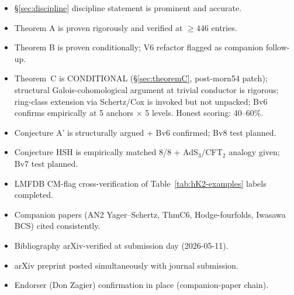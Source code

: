 \documentclass[11pt,a4paper]{amsart}
\theoremstyle{definition}
\begin{document}
\begin{itemize}[leftmargin=2em]
  \item[$\square$] \S\ref{sec:discipline} discipline statement is prominent and accurate.
  \item[$\square$] Theorem A is proven rigorously and verified at $\ge 446$ entries.
  \item[$\square$] Theorem B is proven conditionally; V6 refactor flagged as companion follow-up.
  \item[$\square$] Theorem~C is CONDITIONAL (\S\ref{sec:theoremC}, post-morn54 patch); structural Galois-cohomological argument at trivial conductor is rigorous; ring-class extension via Schertz/Cox is invoked but not unpacked; Bv6 confirms empirically at 5 anchors $\times$ 5 levels. Honest scoring: 40--60\%.
  \item[$\square$] Conjecture A' is structurally argued + Bv6 confirmed; Bv8 test planned.
  \item[$\square$] Conjecture HSH is empirically matched 8/8 + AdS$_3$/CFT$_2$ analogy given; Bv7 test planned.
  \item[$\square$] LMFDB CM-flag cross-verification of Table~\ref{tab:hK2-examples} labels completed.
  \item[$\square$] Companion papers (AN2 Yager--Schertz, ThmC6, Hodge-fourfolds, Iwasawa BCS) cited consistently.
  \item[$\square$] Bibliography arXiv-verified at submission day (2026-05-11).
  \item[$\square$] arXiv preprint posted simultaneously with journal submission.
  \item[$\square$] Endorser (Don Zagier) confirmation in place (companion-paper chain).
\end{itemize}
\end{document}
